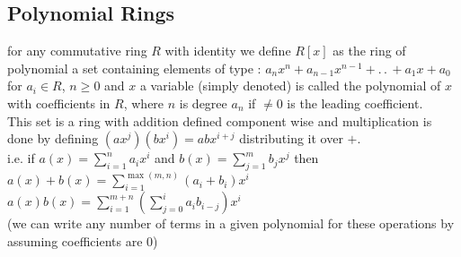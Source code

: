 \documentclass[11pt]{extarticle}
\newcommand{\ck}{.\,.\,}
\newcommand{\snote}[1]{{\footnotesize(#1)}}
\newcommand{\tbx}[2][]{
	\begin{tcolorbox}[enhanced,breakable,size=small,colback=black!2!white,title={#1},arc is angular, arc=1.5mm,drop fuzzy shadow]
		#2
	\end{tcolorbox}
}
\begin{document}
\begin{multicols}{2}
		\section{Polynomial Rings} 

\tbx{for any commutative ring $ R $ with identity we define $ R[x] $ as the ring of polynomial a set containing elements of type :
			$ a_nx^n+a_{n-1}x^{n-1}+\ck +a_1x+a_0 $ for $ a_i\in R $, $ n\geq 0 $ and $ x $ a variable \snote{simply denoted} is called the polynomial of $ x $ with coefficients in $ R $, where  $ n $ is degree $ a_n $ if $ \neq 0 $ is the leading coefficient.\\
			This set is a ring with addition defined component wise and multiplication is done by defining 
			$ (ax^j)(bx^i)=abx^{i+j} $ distributing it over $ + $. \\
			i.e. if $ a(x)=\sum_{i=1}^{n}a_i x^i$ and $ b(x)=\sum_{j=1}^{m} b_j x^j$ then
			$ a(x)+b(x)=\sum_{i=1}^{\max(m,n)}(a_i+b_i)x^i $
			$ a(x)b(x)= \sum_{i=1}^{m+n}(\sum_{j=0}^{i}a_ib_{i-j})x^i$\\
			\snote{we can write any number of terms in a given polynomial for these operations by assuming coefficients are 0}
			} 
		

\end{multicols}
\end{document}
